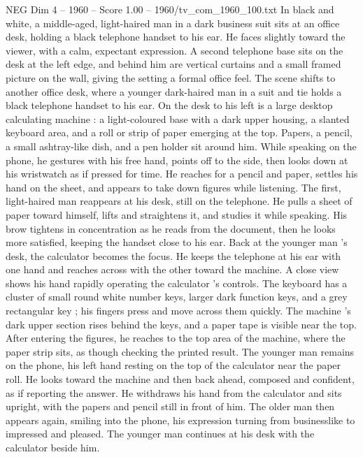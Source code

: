 \begin{textsample}{NEG Dim 4 – 1960 – Score 1.00 – 1960/tv\_com\_1960\_100.txt}  \label{ex:f4_neg_038}
In black and white, a middle-aged, light-haired man in a dark business suit sits at an office desk, holding a black telephone handset to his ear.
He faces slightly toward the viewer, with a calm, expectant expression.
A second telephone base sits on the desk at the left edge, and behind him are vertical curtains and a small framed picture on the wall, giving the setting a formal office feel.
The scene shifts to another office desk, where a younger dark-haired man in a suit and tie holds a black telephone handset to his ear.
On the desk to his left is a large desktop calculating machine : a light-coloured base with a dark upper housing, a slanted keyboard area, and a roll or strip of paper emerging at the top.
Papers, a pencil, a small ashtray-like dish, and a pen holder sit around him.
While speaking on the phone, he gestures with his free hand, points off to the side, then looks down at his wristwatch as if pressed for time.
He reaches for a pencil and paper, settles his hand on the sheet, and appears to take down figures while listening.
The first, light-haired man reappears at his desk, still on the telephone.
He pulls a sheet of paper toward himself, lifts and straightens it, and studies it while speaking.
His brow tightens in concentration as he reads from the document, then he looks more satisfied, keeping the handset close to his ear.
Back at the younger man ’s desk, the calculator becomes the focus.
He keeps the telephone at his ear with one hand and reaches across with the other toward the machine.
A close view shows his hand rapidly operating the calculator ’s controls.
The keyboard has a cluster of small round white number keys, larger dark function keys, and a grey rectangular key ; his fingers press and move across them quickly.
The machine ’s dark upper section rises behind the keys, and a paper tape is visible near the top.
After entering the figures, he reaches to the top area of the machine, where the paper strip sits, as though checking the printed result.
The younger man remains on the phone, his left hand resting on the top of the calculator near the paper roll.
He looks toward the machine and then back ahead, composed and confident, as if reporting the answer.
He withdraws his hand from the calculator and sits upright, with the papers and pencil still in front of him.
The older man then appears again, smiling into the phone, his expression turning from businesslike to impressed and pleased.
The younger man continues at his desk with the calculator beside him.

\end{textsample}
